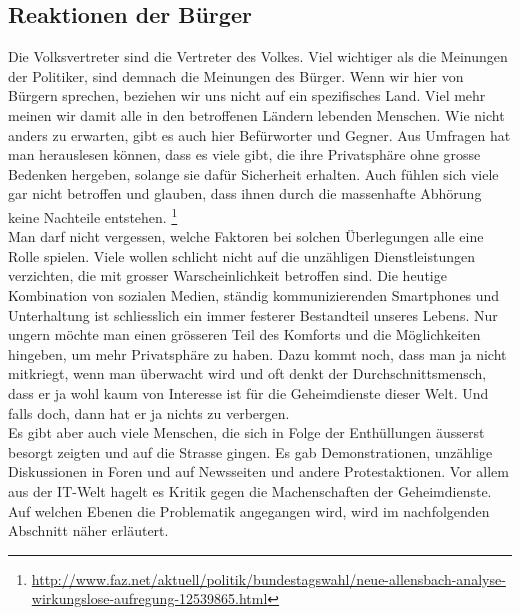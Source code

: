 \subsection{Reaktionen der Bürger}
Die Volksvertreter sind die Vertreter des Volkes. Viel wichtiger als die Meinungen der Politiker, sind demnach die Meinungen des Bürger. Wenn wir hier von Bürgern sprechen, beziehen wir uns nicht auf ein spezifisches Land. Viel mehr meinen wir damit alle in den betroffenen Ländern lebenden Menschen. Wie nicht anders zu erwarten, gibt es auch hier Befürworter und Gegner. Aus Umfragen hat man herauslesen können, dass es viele gibt, die ihre Privatsphäre ohne grosse Bedenken hergeben, solange sie dafür Sicherheit erhalten. Auch fühlen sich viele gar nicht betroffen und glauben, dass ihnen durch die massenhafte Abhörung keine Nachteile entstehen. 
\footnote{\url{http://www.faz.net/aktuell/politik/bundestagswahl/neue-allensbach-analyse-wirkungslose-aufregung-12539865.html}}
\\
Man darf nicht vergessen, welche Faktoren bei solchen Überlegungen alle eine Rolle spielen. Viele wollen schlicht nicht auf die unzähligen Dienstleistungen verzichten, die mit grosser Warscheinlichkeit betroffen sind. Die heutige Kombination von sozialen Medien, ständig kommunizierenden Smartphones und Unterhaltung ist schliesslich ein immer festerer Bestandteil unseres Lebens. Nur ungern möchte man einen grösseren Teil des Komforts und die Möglichkeiten hingeben, um mehr Privatsphäre zu haben. Dazu kommt noch, dass man ja nicht mitkriegt, wenn man überwacht wird und oft denkt der Durchschnittsmensch, dass er ja wohl kaum von Interesse ist für die Geheimdienste dieser Welt. Und falls doch, dann hat er ja nichts zu verbergen.
\\
Es gibt aber auch viele Menschen, die sich in Folge der Enthüllungen äusserst besorgt zeigten und auf die Strasse gingen. Es gab Demonstrationen, unzählige Diskussionen in Foren und auf Newsseiten und andere Protestaktionen. Vor allem aus der IT-Welt hagelt es Kritik gegen die Machenschaften der Geheimdienste. Auf welchen Ebenen die Problematik angegangen wird, wird im nachfolgenden Abschnitt näher erläutert. 
